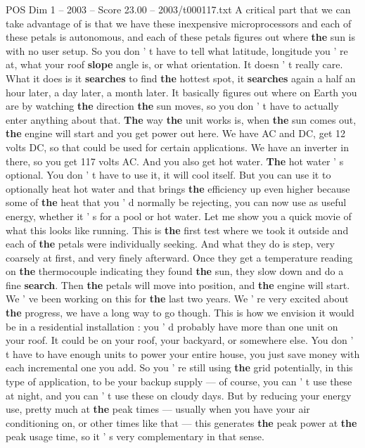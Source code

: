 \begin{textsample}{POS Dim 1 – 2003 – Score 23.00 – 2003/t000117.txt}
A critical part that we can take advantage of is that we have these inexpensive microprocessors and each of these petals is autonomous, and each of these petals figures out where \textbf{the} sun is with no user setup.
So you don ' t have to tell what latitude, longitude you ' re at, what your roof \textbf{slope} angle is, or what orientation.
It doesn ' t really care.
What it does is it \textbf{searches} to find \textbf{the} hottest spot, it \textbf{searches} again a half an hour later, a day later, a month later.
It basically figures out where on Earth you are by watching \textbf{the} direction \textbf{the} sun moves, so you don ' t have to actually enter anything about that. \textbf{The} way \textbf{the} unit works is, when \textbf{the} sun comes out, \textbf{the} engine will start and you get power out here.
We have AC and DC, get 12 volts DC, so that could be used for certain applications.
We have an inverter in there, so you get 117 volts AC.
And you also get hot water. \textbf{The} hot water ' s optional.
You don ' t have to use it, it will cool itself.
But you can use it to optionally heat hot water and that brings \textbf{the} efficiency up even higher because some of \textbf{the} heat that you ' d normally be rejecting, you can now use as useful energy, whether it ' s for a pool or hot water.
Let me show you a quick movie of what this looks like running.
This is \textbf{the} first test where we took it outside and each of \textbf{the} petals were individually seeking.
And what they do is step, very coarsely at first, and very finely afterward.
Once they get a temperature reading on \textbf{the} thermocouple indicating they found \textbf{the} sun, they slow down and do a fine \textbf{search}.
Then \textbf{the} petals will move into position, and \textbf{the} engine will start.
We ' ve been working on this for \textbf{the} last two years.
We ' re very excited about \textbf{the} progress, we have a long way to go though.
This is how we envision it would be in a residential installation : you ' d probably have more than one unit on your roof.
It could be on your roof, your backyard, or somewhere else.
You don ' t have to have enough units to power your entire house, you just save money with each incremental one you add.
So you ' re still using \textbf{the} grid potentially, in this type of application, to be your backup supply — of course, you can ' t use these at night, and you can ' t use these on cloudy days.
But by reducing your energy use, pretty much at \textbf{the} peak times — usually when you have your air conditioning on, or other times like that — this generates \textbf{the} peak power at \textbf{the} peak usage time, so it ' s very complementary in that sense.

\end{textsample}
